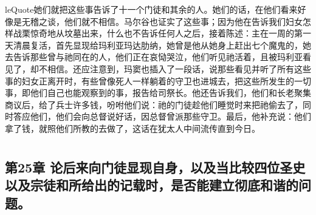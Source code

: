 leQuote{她们就把这些事告诉了十一个门徒和其余的人。她们的话，在他们看来好像是无稽之谈，他们就不相信。}马尔谷也证实了这些事；因为他在告诉我们妇女怎样战栗惊奇地从坟墓出来，什么也不告诉任何人之后，接着陈述：主在一周的第一天清晨复活，首先显现给玛利亚玛达肋纳，她曾是他从她身上赶出七个魔鬼的，她去告诉那些曾与祂同在的人，他们正在哀恸哭泣，他们听见祂活着，且被玛利亚看见了，却不相信。还应注意到，玛窦也插入了一段话，说那些看见并听了所有这些事的妇女正离开时，有些曾像死人一样躺着的守卫也进城去，把这些所发生的一切事，即他们自己也能观察到的事，报告给司祭长。他还告诉我们，他们和长老聚集商议后，给了兵士许多钱，吩咐他们说：祂的门徒趁他们睡觉时来把祂偷去了，同时答应他们，他们会向总督说好话，因总督曾派那些守卫。最后，他补充说：他们拿了钱，就照他们所教的去做了，这话在犹太人中间流传直到今日。\par



\section{}


\subsection{第25章 论后来向门徒显现自身，以及当比较四位圣史以及宗徒和所给出的记载时，是否能建立彻底和谐的问题。}

